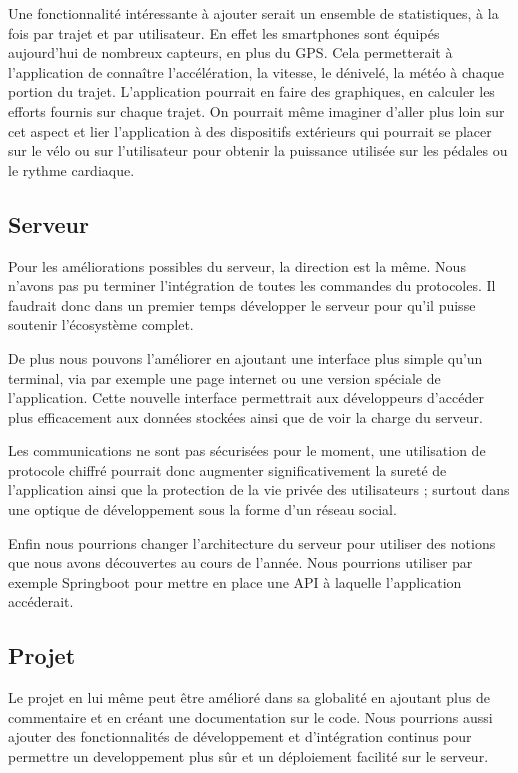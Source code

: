 Une fonctionnalité intéressante à ajouter serait un ensemble de statistiques, à la fois par trajet et par utilisateur. En effet les smartphones
sont équipés aujourd'hui de nombreux capteurs, en plus du GPS. Cela permetterait à l'application de connaître l'accélération, la vitesse, le
dénivelé, la météo à chaque portion du trajet. L'application pourrait en faire des graphiques, en calculer les efforts fournis sur chaque trajet.
On pourrait même imaginer d'aller plus loin sur cet aspect et lier l'application à des dispositifs extérieurs qui pourrait se placer sur le
vélo ou sur l'utilisateur pour obtenir la puissance utilisée sur les pédales ou le rythme cardiaque.
\subsection{Serveur}
Pour les améliorations possibles du serveur, la direction est la même. Nous n'avons pas pu terminer l'intégration de toutes les commandes du protocoles.
Il faudrait donc dans un premier temps développer le serveur pour qu'il puisse soutenir l'écosystème complet.
\par
De plus nous pouvons l'améliorer en ajoutant une interface plus simple qu'un terminal, via par exemple une page internet ou une version spéciale de l'application.
Cette nouvelle interface permettrait aux développeurs d'accéder plus efficacement aux données stockées ainsi que de voir la charge du serveur.
\par
Les communications ne sont pas sécurisées pour le moment, une utilisation de protocole chiffré pourrait donc augmenter significativement la sureté de l'application ainsi que la protection de la vie privée des utilisateurs ; surtout dans une optique de développement sous la forme d'un réseau social.
\par
Enfin nous pourrions changer l'architecture du serveur pour utiliser des notions que nous avons découvertes au cours de l'année. Nous pourrions utiliser par exemple Springboot pour mettre en place une API à laquelle l'application accéderait.

\subsection{Projet}
Le projet en lui même peut être amélioré dans sa globalité en ajoutant plus de commentaire et en créant une documentation sur le code.
Nous pourrions aussi ajouter des fonctionnalités de développement et d'intégration continus pour permettre un developpement plus sûr et un déploiement facilité sur le serveur.